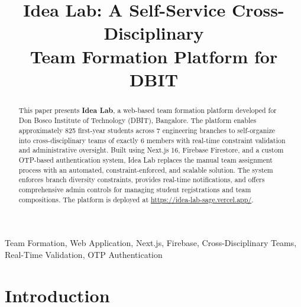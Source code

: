 \documentclass[conference]{IEEEtran}
\begin{document}
\title{Idea Lab: A Self-Service Cross-Disciplinary\\Team Formation Platform for DBIT}

\author{
}

\maketitle

\begin{abstract}
This paper presents \textbf{Idea Lab}, a web-based team formation platform developed for Don Bosco Institute of Technology (DBIT), Bangalore. The platform enables approximately 825 first-year students across 7 engineering branches to self-organize into cross-disciplinary teams of exactly 6 members with real-time constraint validation and administrative oversight. Built using Next.js 16, Firebase Firestore, and a custom OTP-based authentication system, Idea Lab replaces the manual team assignment process with an automated, constraint-enforced, and scalable solution. The system enforces branch diversity constraints, provides real-time notifications, and offers comprehensive admin controls for managing student registrations and team compositions. The platform is deployed at \url{https://idea-lab-sage.vercel.app/}.
\end{abstract}

\begin{IEEEkeywords}
Team Formation, Web Application, Next.js, Firebase, Cross-Disciplinary Teams, Real-Time Validation, OTP Authentication
\end{IEEEkeywords}

\section{Introduction}
\end{document}
